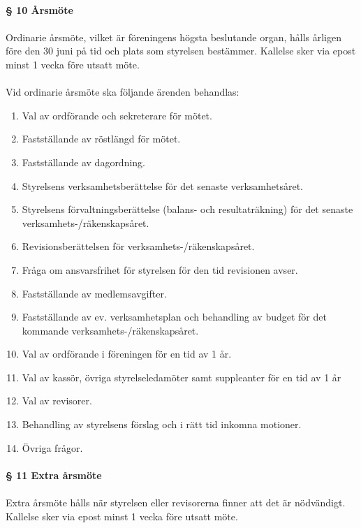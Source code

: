 \documentclass[12pt, a4paper]{article}
\begin{document}
\paragraph{§ 10 Årsmöte}
\paragraph{}
Ordinarie årsmöte, vilket är föreningens högsta beslutande organ, hålls årligen före den 30 juni på tid och plats som styrelsen bestämmer. Kallelse sker via epost minst 1 vecka före utsatt möte.

\paragraph{}
Vid ordinarie årsmöte ska följande ärenden behandlas:
\begin{enumerate}
\item Val av ordförande och sekreterare för mötet.
\item Fastställande av röstlängd för mötet.
\item Fastställande av dagordning.
\item Styrelsens verksamhetsberättelse för det senaste verksamhetsåret.
\item Styrelsens förvaltningsberättelse (balans- och resultaträkning) för det senaste verksamhets-/räkenskapsåret.
\item Revisionsberättelsen för verksamhets-/räkenskapsåret.
\item Fråga om ansvarsfrihet för styrelsen för den tid revisionen avser.
\item Fastställande av medlemsavgifter.
\item Fastställande av ev. verksamhetsplan och behandling av budget för det kommande verksamhets-/räkenskapsåret.
\item Val av ordförande i föreningen för en tid av 1 år.
\item Val av kassör, övriga styrelseledamöter samt suppleanter för en tid av 1 år
\item Val av revisorer.
\item Behandling av styrelsens förslag och i rätt tid inkomna motioner.
\item Övriga frågor. 
\end{enumerate}

\paragraph{§ 11 Extra årsmöte}
\paragraph{}
Extra årsmöte hålls när styrelsen eller revisorerna finner att det är nödvändigt. Kallelse sker via epost minst 1 vecka före utsatt möte.
\end{document}
